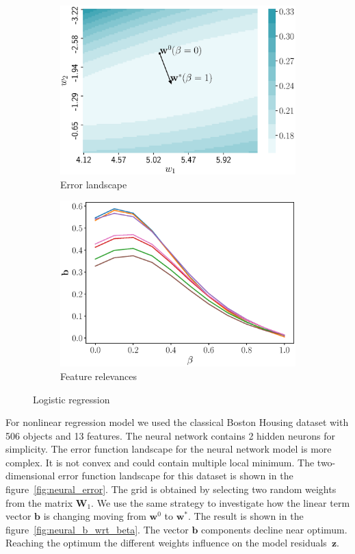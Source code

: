 \documentclass[a4paper,12pt]{article}
\theoremstyle{plain} %
\theoremstyle{definition} %
\theoremstyle{remark} %
\newcommand{\bb}{\mathbf{b}}
\newcommand{\bw}{\mathbf{w}}
\newcommand{\bz}{\mathbf{z}}
\newcommand{\bW}{\mathbf{W}}
\begin{document}
	\begin{figure}
		\centering
		\begin{subfigure}{.5\textwidth}
			\centering
			\includegraphics[width=\linewidth]{figs/log_reg_error}
			\caption{Error landscape}
			\label{fig:log_reg_error}
		\end{subfigure}%
		\begin{subfigure}{.5\textwidth}
			\centering
			\includegraphics[width=\linewidth]{figs/log_reg_b_wrt_beta.eps}
			\caption{Feature relevances}
			\label{fig:log_reg_b_wrt_beta}
		\end{subfigure}
		\caption{Logistic regression}
	\end{figure}
  	
  	For nonlinear regression model we used the classical Boston Housing dataset with 506 objects and 13 features.
  	The neural network contains 2 hidden neurons for simplicity.
  	The error function landscape for the neural network model is more complex. 
  	It is not convex and could contain multiple local minimum.
  	The two-dimensional error function landscape for this dataset is shown in the figure~\ref{fig:neural_error}. 
  	The grid is obtained by selecting two random weights from the matrix $\bW_1$.
  	We use the same strategy to investigate how the linear term vector $\bb$ is changing moving from $\bw^0$ to $\bw^*$. 
  	The result is shown in the figure~\ref{fig:neural_b_wrt_beta}.
  	The vector $\bb$ components decline near optimum. Reaching the optimum the different weights influence on the model residuals~$\bz$.
  
\end{document}
